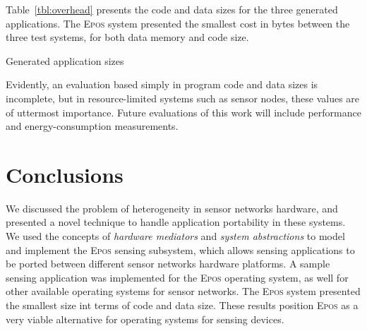Table~\ref{tbl:overhead} presents the code and data sizes for the
three generated applications. The \textsc{Epos} system presented the
smallest cost in bytes between the three test systems, for both
data memory and code size.



\begin{table}[h]
\begin{center}

\end{center}
\caption{Generated application sizes}
\label{tbl:overhead}
\end{table}

Evidently, an evaluation based simply in program code and data sizes is
incomplete, but in resource-limited systems such as sensor nodes, these
values are of uttermost importance. Future evaluations of this work will
include performance and energy-consumption measurements.




\section{Conclusions}

We discussed the problem of heterogeneity in sensor
networks hardware, and presented a novel technique to handle
application portability in these systems. We used the concepts of
\emph{hardware mediators} and \emph{system abstractions} to model and 
implement the \textsc{Epos} sensing subsystem, which allows sensing
applications to be ported between different sensor networks hardware
platforms.  A sample sensing application was implemented for the
\textsc{Epos} operating system, as well for other available operating
systems for sensor networks. The \textsc{Epos} system presented the
smallest size int terms of code and data size. These results position
\textsc{Epos} as a very viable alternative for operating systems for
sensing devices.




